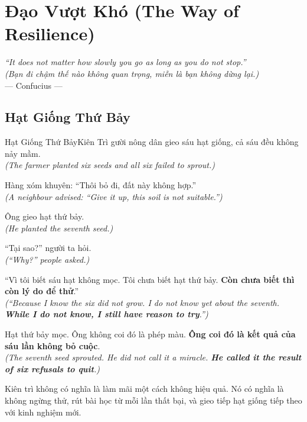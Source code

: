 \chapter{Đạo Vượt Khó (The Way of Resilience)}

\begin{center}
  \textit{\color{truyenblue}``It does not matter how slowly you go as long as you do not stop.''}\\
  \textit{(Bạn đi chậm thế nào không quan trọng, miễn là bạn không dừng lại.)}\\[4pt]
  \small\color{truyengold}--- Confucius ---
\end{center}
\ngancach

\section{Hạt Giống Thứ Bảy}
\begin{truyen}{Hạt Giống Thứ Bảy}{Kiên Trì}
gười nông dân gieo sáu hạt giống, cả sáu đều không nảy mầm.\\
\textit{(The farmer planted six seeds and all six failed to sprout.)}

Hàng xóm khuyên: ``Thôi bỏ đi, đất này không hợp.''\\
\textit{(A neighbour advised: ``Give it up, this soil is not suitable.'')}

Ông gieo hạt thứ bảy.\\
\textit{(He planted the seventh seed.)}

``Tại sao?'' người ta hỏi.\\
\textit{(``Why?'' people asked.)}

``Vì tôi biết sáu hạt không mọc. Tôi chưa biết hạt thứ bảy. \textbf{Còn chưa biết thì còn lý do để thử}.''\\
\textit{(``Because I know the six did not grow. I do not know yet about the seventh. \textbf{While I do not know, I still have reason to try}.'')}

Hạt thứ bảy mọc. Ông không coi đó là phép màu. \textbf{Ông coi đó là kết quả của sáu lần không bỏ cuộc}.\\
\textit{(The seventh seed sprouted. He did not call it a miracle. \textbf{He called it the result of six refusals to quit}.)}
\end{truyen}
\begin{baihoc}
  Kiên trì không có nghĩa là làm mãi một cách không hiệu quả. Nó có nghĩa là không ngừng thử, rút bài học từ mỗi lần thất bại, và gieo tiếp hạt giống tiếp theo với kinh nghiệm mới.
\end{baihoc}

